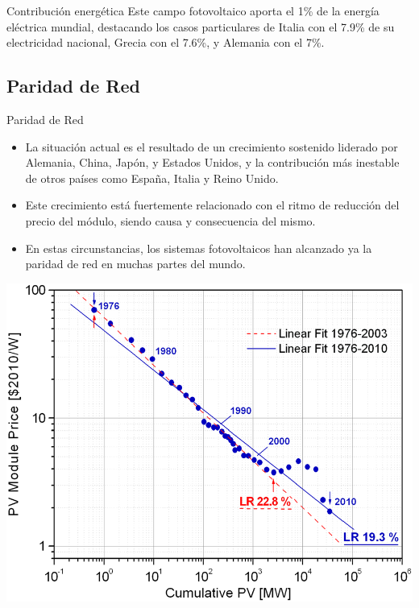 \documentclass[xcolor={usenames,svgnames,dvipsnames}]{beamer}
\begin{document}
\begin{frame}[label={sec:org2891ce1}]{Contribución energética}
Este campo fotovoltaico aporta el 1\% de la energía eléctrica mundial,
destacando los casos particulares de Italia con el 7.9\% de su
electricidad nacional, Grecia con el 7.6\%, y Alemania con el 7\%.
\end{frame}

\subsection{Paridad de Red}
\label{sec:org52b267e}

\begin{frame}[label={sec:orgeb78aee}]{Paridad de Red}
\begin{itemize}
\item La situación actual es el resultado de un crecimiento sostenido
liderado por Alemania, China, Japón, y Estados Unidos, y la
contribución más inestable de otros países como España, Italia y
Reino Unido.

\item Este crecimiento está fuertemente relacionado con el ritmo de
reducción del precio del módulo, siendo causa y consecuencia del
mismo.

\item En estas circunstancias, los sistemas fotovoltaicos han alcanzado ya
la paridad de red en muchas partes del mundo.
\end{itemize}
\end{frame}


\begin{frame}[label={sec:org5b3a6f5}]{}
\begin{center}
\includegraphics[width=.9\linewidth]{../figs/CurvaAprendizajeFV_BreyerPiP.png}
\end{center}
\end{frame}
\end{document}
